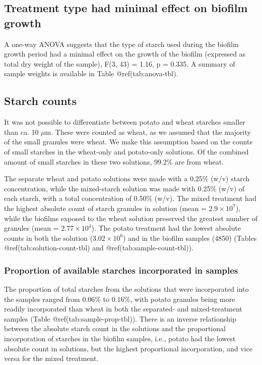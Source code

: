 \documentclass[
  letterpaper,
]{book}
\begin{document}
\hypertarget{treatment-type-had-minimal-effect-on-biofilm-growth}{%
\subsection{Treatment type had minimal effect on biofilm
growth}\label{treatment-type-had-minimal-effect-on-biofilm-growth}}

A one-way ANOVA suggests that the type of starch used during the biofilm
growth period had a minimal effect on the growth of the biofilm
(expressed as total dry weight of the sample), F(3, 43) = 1.16, p =
0.335. A summary of sample weights is available in Table
@ref(tab:anova-tbl).

\hypertarget{starch-counts}{%
\subsection{Starch counts}\label{starch-counts}}

It was not possible to differentiate between potato and wheat starches
smaller than ca. 10 \(\mu\)m. These were counted as wheat, as we assumed
that the majority of the small granules were wheat. We make this
assumption based on the counts of small starches in the wheat-only and
potato-only solutions. Of the combined amount of small starches in these
two solutions, 99.2\% are from wheat.

The separate wheat and potato solutions were made with a 0.25\% (w/v)
starch concentration, while the mixed-starch solution was made with
0.25\% (w/v) of each starch, with a total concentration of 0.50\% (w/v).
The mixed treatment had the highest absolute count of starch granules in
solution (mean = \ensuremath{2.9\times 10^{7}}), while the biofilms
exposed to the wheat solution preserved the greatest number of granules
(mean = \ensuremath{2.77\times 10^{4}}). The potato treatment had the
lowest absolute counts in both the solution
(\ensuremath{3.02\times 10^{6}}) and in the biofilm samples (4850)
(Tables @ref(tab:solution-count-tbl) and @ref(tab:sample-count-tbl)).

\hypertarget{proportion-of-available-starches-incorporated-in-samples}{%
\subsubsection{Proportion of available starches incorporated in
samples}\label{proportion-of-available-starches-incorporated-in-samples}}

The proportion of total starches from the solutions that were
incorporated into the samples ranged from 0.06\% to 0.16\%, with potato
granules being more readily incorporated than wheat in both the
separated- and mixed-treatment samples (Table
@ref(tab:sample-prop-tbl)). There is an inverse relationship between the
absolute starch count in the solutions and the proportional
incorporation of starches in the biofilm samples, i.e., potato had the
lowest absolute count in solutions, but the highest proportional
incorporation, and vice versa for the mixed treatment.
\end{document}
